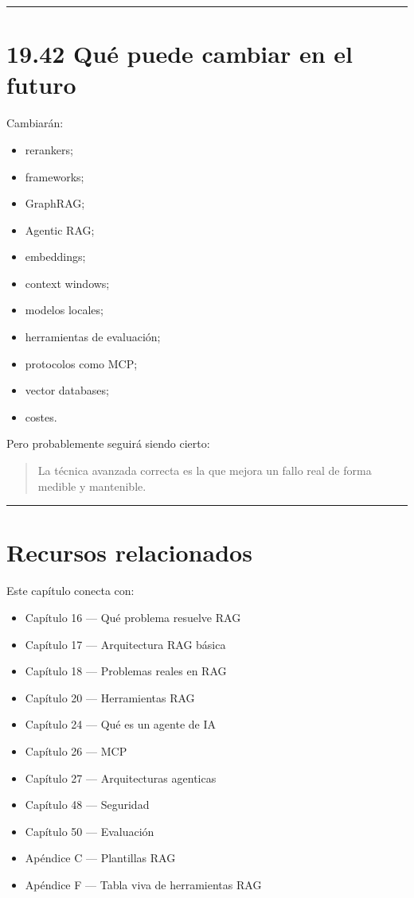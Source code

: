 \begin{center}\rule{0.5\linewidth}{0.5pt}\end{center}

\section{19.42 Qué puede cambiar en el
futuro}\label{quuxe9-puede-cambiar-en-el-futuro-18}

Cambiarán:

\begin{itemize}
\tightlist
\item
  rerankers;
\item
  frameworks;
\item
  GraphRAG;
\item
  Agentic RAG;
\item
  embeddings;
\item
  context windows;
\item
  modelos locales;
\item
  herramientas de evaluación;
\item
  protocolos como MCP;
\item
  vector databases;
\item
  costes.
\end{itemize}

Pero probablemente seguirá siendo cierto:

\begin{quote}
La técnica avanzada correcta es la que mejora un fallo real de forma
medible y mantenible.
\end{quote}

\begin{center}\rule{0.5\linewidth}{0.5pt}\end{center}

\section{Recursos relacionados}\label{recursos-relacionados-18}

Este capítulo conecta con:

\begin{itemize}
\tightlist
\item
  Capítulo 16 --- Qué problema resuelve RAG
\item
  Capítulo 17 --- Arquitectura RAG básica
\item
  Capítulo 18 --- Problemas reales en RAG
\item
  Capítulo 20 --- Herramientas RAG
\item
  Capítulo 24 --- Qué es un agente de IA
\item
  Capítulo 26 --- MCP
\item
  Capítulo 27 --- Arquitecturas agenticas
\item
  Capítulo 48 --- Seguridad
\item
  Capítulo 50 --- Evaluación
\item
  Apéndice C --- Plantillas RAG
\item
  Apéndice F --- Tabla viva de herramientas RAG
\end{itemize}

